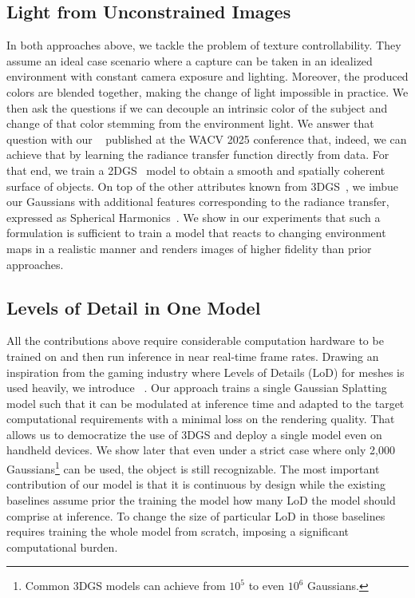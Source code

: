   \subsection{Light from Unconstrained Images}
    In both approaches above, we tackle the problem of texture
    controllability.
    They assume an ideal case scenario where a capture can be taken in an
    idealized environment with constant camera exposure and lighting.
    Moreover, the produced colors are blended together, making the change of
    light impossible in practice.
    We then ask the questions if we can decouple an intrinsic color of the
    subject and change of that color stemming from the environment light.
    We answer that question with our \lumigauss~\cite{kaleta2024lumigauss}
    published at the WACV 2025 conference that, indeed, we can achieve that by
    learning the radiance transfer function directly from data.
    For that end, we train a 2DGS~\cite{huang20242d} model to obtain a smooth
    and spatially coherent surface of objects.
    On top of the other attributes known from 3DGS~\cite{kerbl20233d}, we
    imbue our Gaussians with additional features corresponding to the radiance
    transfer, expressed as Spherical Harmonics~\cite{green2003grittydetail}.
    We show in our experiments that such a formulation is sufficient to train
    a model that reacts to changing environment maps in a realistic manner and
    renders images of higher fidelity than prior approaches.

  \subsection{Levels of Detail in One Model}
    All the contributions above require considerable computation hardware to
    be trained on and then run inference in near real-time frame rates.
    Drawing an inspiration from the gaming industry where Levels of Details
    (LoD) for meshes is used heavily, we introduce \clog~\cite{kania2024clog}.
    Our approach trains a single Gaussian Splatting model such that it can be
    modulated at inference time and adapted to the target computational
    requirements with a minimal loss on the rendering quality.
    That allows us to democratize the use of 3DGS and deploy a single model
    even on handheld devices.
    We show later that even under a strict case where only 2,000
    Gaussians\footnote{Common 3DGS models can achieve from $10^5$ to even
    $10^6$ Gaussians.
    } can be used, the object is still recognizable.
    The most important contribution of our model is that it is continuous by
    design while the existing baselines assume prior the training the model
    how many LoD the model should comprise at inference.
    To change the size of particular LoD in those baselines requires training
    the whole model from scratch, imposing a significant computational burden.

